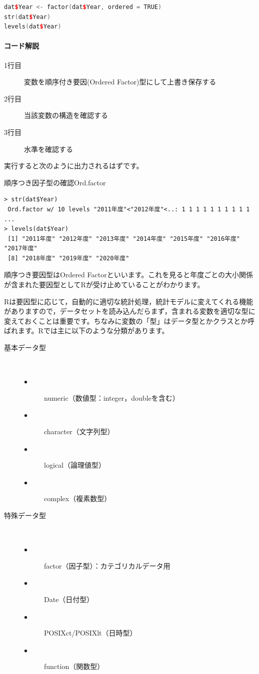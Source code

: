 \documentclass{ltjsbook}
\begin{document}
\begin{lstlisting}[language=c++,label={code:4_03},caption={Ord.Factor型に変換する}]
dat$Year <- factor(dat$Year, ordered = TRUE)
str(dat$Year)
levels(dat$Year)
\end{lstlisting}
    
\paragraph{コード解説}
\begin{description}
    \item[1行目] 変数を順序付き要因(Ordered Factor)型にして上書き保存する
    \item[2行目] 当該変数の構造を確認する
    \item[3行目] 水準を確認する 
\end{description}

実行すると次のように出力されるはずです。
\begin{Rscreen}{順序つき因子型の確認}{Ord.factor}
\begin{verbatim}
> str(dat$Year)
 Ord.factor w/ 10 levels "2011年度"<"2012年度"<..: 1 1 1 1 1 1 1 1 1 1 ...
> levels(dat$Year)
 [1] "2011年度" "2012年度" "2013年度" "2014年度" "2015年度" "2016年度" "2017年度" 
 [8] "2018年度" "2019年度" "2020年度"
\end{verbatim}
\end{Rscreen}

順序つき要因型はOrdered Factorといいます。これを見ると年度ごとの大小関係が含まれた要因型としてRが受け止めていることがわかります。

Rは要因型に応じて，自動的に適切な統計処理，統計モデルに変えてくれる機能がありますので，データセットを読み込んだらまず，含まれる変数を適切な型に変えておくことは重要です。ちなみに変数の「型」はデータ型とかクラスとか呼ばれます。Rでは主に以下のような分類があります。

\begin{description}
    \item[基本データ型]~
    \begin{description}
        \item[$\bullet$] numeric（数値型：integer，doubleを含む）
        \item[$\bullet$] character（文字列型）
        \item[$\bullet$] logical（論理値型）
        \item[$\bullet$] complex（複素数型）
    \end{description}
    
    \item[特殊データ型]~
    \begin{description}
        \item[$\bullet$] factor（因子型）：カテゴリカルデータ用
        \item[$\bullet$] Date（日付型）
        \item[$\bullet$] POSIXct/POSIXlt（日時型）
        \item[$\bullet$] function（関数型）
    \end{description}
\end{description}
\end{document}
